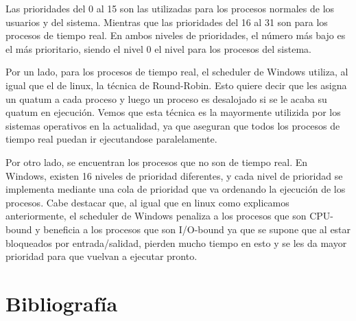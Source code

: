 \documentclass[a4paper, 12pt]{article}
\begin{document}
Las prioridades del 0 al 15 son las utilizadas para los procesos normales de los usuarios y del sistema. Mientras que las prioridades del 16 al 31 son para los procesos de tiempo real. En ambos niveles de prioridades, el n\'umero m\'as bajo es el m\'as prioritario, siendo el nivel 0 el nivel para los procesos del sistema.

Por un lado, para los procesos de tiempo real, el scheduler de Windows utiliza, al igual que el de linux, la t\'ecnica de Round-Robin. Esto quiere decir que les asigna un quatum a cada proceso y luego un proceso es desalojado si se le acaba su quatum en ejecuci\'on. Vemos que esta t\'ecnica es la mayormente utilizida por los sistemas operativos en la actualidad, ya que aseguran que todos los procesos de tiempo real puedan ir ejecutandose paralelamente. 

Por otro lado, se encuentran los procesos que no son de tiempo real. En Windows, existen 16 niveles de prioridad diferentes, y cada nivel de prioridad se implementa mediante una cola de prioridad que va ordenando la ejecuci\'on de los procesos. Cabe destacar que, al igual que en linux como explicamos anteriormente, el scheduler de Windows penaliza a los procesos que son CPU-bound y beneficia a los procesos que son I/O-bound ya que se supone que al estar bloqueados por entrada/salidad, pierden mucho tiempo en esto y se les da mayor prioridad para que vuelvan a ejecutar pronto.







\section*{Bibliograf\'ia}
\end{document}
